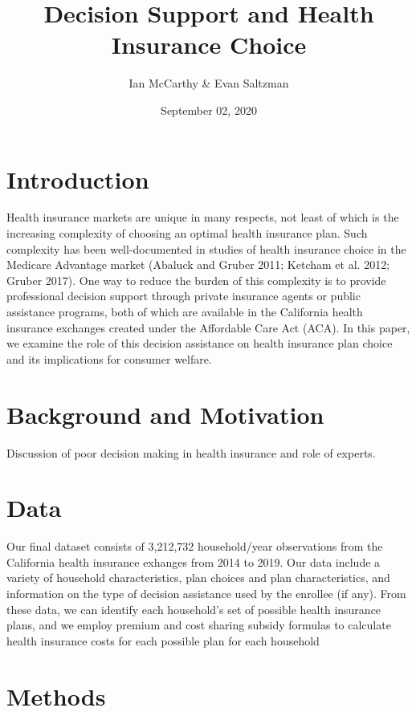 \documentclass[
  12pt,
]{article}
\title{Decision Support and Health Insurance Choice}
\author{Ian McCarthy \& Evan Saltzman}
\date{September 02, 2020}
\begin{document}
\maketitle

\hypertarget{introduction}{%
\section{Introduction}\label{introduction}}

Health insurance markets are unique in many respects, not least of which is the increasing complexity of choosing an optimal health insurance plan. Such complexity has been well-documented in studies of health insurance choice in the Medicare Advantage market (Abaluck and Gruber 2011; Ketcham et al. 2012; Gruber 2017). One way to reduce the burden of this complexity is to provide professional decision support through private insurance agents or public assistance programs, both of which are available in the California health insurance exchanges created under the Affordable Care Act (ACA). In this paper, we examine the role of this decision assistance on health insurance plan choice and its implications for consumer welfare.

\hypertarget{background-and-motivation}{%
\section{Background and Motivation}\label{background-and-motivation}}

Discussion of poor decision making in health insurance and role of experts.

\hypertarget{data}{%
\section{Data}\label{data}}

Our final dataset consists of 3,212,732 household/year observations from the California health insurance exhanges from 2014 to 2019. Our data include a variety of household characteristics, plan choices and plan characteristics, and information on the type of decision assistance used by the enrollee (if any). From these data, we can identify each household's set of possible health insurance plans, and we employ premium and cost sharing subsidy formulas to calculate health insurance costs for each possible plan for each household

\hypertarget{methods}{%
\section{Methods}\label{methods}}
\end{document}
